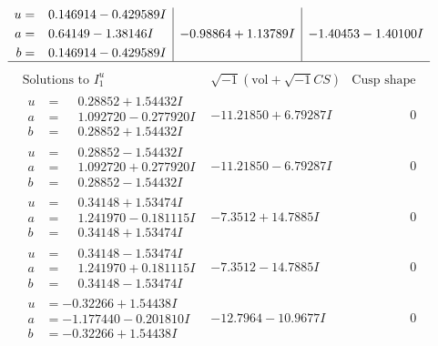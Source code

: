 \documentclass[1p]{elsarticle_modified}
\theoremstyle{definition}
\newcommand{\I}{\sqrt{-1}}
\begin{document}
$$\begin{array}{c|c|c}
\begin{aligned}
u &= \phantom{-}0.146914 - 0.429589 I \\
a &= \phantom{-}0.64149 - 1.38146 I \\
b &= \phantom{-}0.146914 - 0.429589 I\end{aligned}
 & -0.98864 + 1.13789 I & -1.40453 - 1.40100 I\\
 \hline 
 \end{array}$$\newpage$$\begin{array}{c|c|c}  
\text{Solutions to }I^u_{1}& \I (\text{vol} + \sqrt{-1}CS) & \text{Cusp shape}\\
 \hline 
\begin{aligned}
u &= \phantom{-}0.28852 + 1.54432 I \\
a &= \phantom{-}1.092720 - 0.277920 I \\
b &= \phantom{-}0.28852 + 1.54432 I\end{aligned}
 & -11.21850 + 6.79287 I & \phantom{-0.000000 } 0 \\ \hline\begin{aligned}
u &= \phantom{-}0.28852 - 1.54432 I \\
a &= \phantom{-}1.092720 + 0.277920 I \\
b &= \phantom{-}0.28852 - 1.54432 I\end{aligned}
 & -11.21850 - 6.79287 I & \phantom{-0.000000 } 0 \\ \hline\begin{aligned}
u &= \phantom{-}0.34148 + 1.53474 I \\
a &= \phantom{-}1.241970 - 0.181115 I \\
b &= \phantom{-}0.34148 + 1.53474 I\end{aligned}
 & -7.3512 + 14.7885 I & \phantom{-0.000000 } 0 \\ \hline\begin{aligned}
u &= \phantom{-}0.34148 - 1.53474 I \\
a &= \phantom{-}1.241970 + 0.181115 I \\
b &= \phantom{-}0.34148 - 1.53474 I\end{aligned}
 & -7.3512 - 14.7885 I & \phantom{-0.000000 } 0 \\ \hline\begin{aligned}
u &= -0.32266 + 1.54438 I \\
a &= -1.177440 - 0.201810 I \\
b &= -0.32266 + 1.54438 I\end{aligned}
 & -12.7964 - 10.9677 I & \phantom{-0.000000 } 0 \\ \hline\begin{aligned}

\end{aligned}
\end{array}$$
\end{document}
